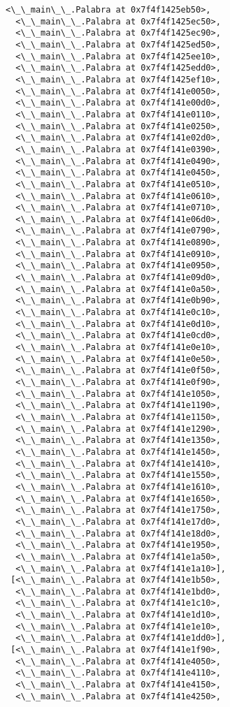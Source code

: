 \documentclass[12pt,a4paper,table]{article}
\begin{document}
\begin{tcolorbox}[breakable, size=fbox, boxrule=.5pt, pad at break*=1mm, opacityfill=0]
\begin{Verbatim}[commandchars=\\\{\}]
  <\_\_main\_\_.Palabra at 0x7f4f1425eb50>,
  <\_\_main\_\_.Palabra at 0x7f4f1425ec50>,
  <\_\_main\_\_.Palabra at 0x7f4f1425ec90>,
  <\_\_main\_\_.Palabra at 0x7f4f1425ed50>,
  <\_\_main\_\_.Palabra at 0x7f4f1425ee10>,
  <\_\_main\_\_.Palabra at 0x7f4f1425edd0>,
  <\_\_main\_\_.Palabra at 0x7f4f1425ef10>,
  <\_\_main\_\_.Palabra at 0x7f4f141e0050>,
  <\_\_main\_\_.Palabra at 0x7f4f141e00d0>,
  <\_\_main\_\_.Palabra at 0x7f4f141e0110>,
  <\_\_main\_\_.Palabra at 0x7f4f141e0250>,
  <\_\_main\_\_.Palabra at 0x7f4f141e02d0>,
  <\_\_main\_\_.Palabra at 0x7f4f141e0390>,
  <\_\_main\_\_.Palabra at 0x7f4f141e0490>,
  <\_\_main\_\_.Palabra at 0x7f4f141e0450>,
  <\_\_main\_\_.Palabra at 0x7f4f141e0510>,
  <\_\_main\_\_.Palabra at 0x7f4f141e0610>,
  <\_\_main\_\_.Palabra at 0x7f4f141e0710>,
  <\_\_main\_\_.Palabra at 0x7f4f141e06d0>,
  <\_\_main\_\_.Palabra at 0x7f4f141e0790>,
  <\_\_main\_\_.Palabra at 0x7f4f141e0890>,
  <\_\_main\_\_.Palabra at 0x7f4f141e0910>,
  <\_\_main\_\_.Palabra at 0x7f4f141e0950>,
  <\_\_main\_\_.Palabra at 0x7f4f141e09d0>,
  <\_\_main\_\_.Palabra at 0x7f4f141e0a50>,
  <\_\_main\_\_.Palabra at 0x7f4f141e0b90>,
  <\_\_main\_\_.Palabra at 0x7f4f141e0c10>,
  <\_\_main\_\_.Palabra at 0x7f4f141e0d10>,
  <\_\_main\_\_.Palabra at 0x7f4f141e0cd0>,
  <\_\_main\_\_.Palabra at 0x7f4f141e0e10>,
  <\_\_main\_\_.Palabra at 0x7f4f141e0e50>,
  <\_\_main\_\_.Palabra at 0x7f4f141e0f50>,
  <\_\_main\_\_.Palabra at 0x7f4f141e0f90>,
  <\_\_main\_\_.Palabra at 0x7f4f141e1050>,
  <\_\_main\_\_.Palabra at 0x7f4f141e1190>,
  <\_\_main\_\_.Palabra at 0x7f4f141e1150>,
  <\_\_main\_\_.Palabra at 0x7f4f141e1290>,
  <\_\_main\_\_.Palabra at 0x7f4f141e1350>,
  <\_\_main\_\_.Palabra at 0x7f4f141e1450>,
  <\_\_main\_\_.Palabra at 0x7f4f141e1410>,
  <\_\_main\_\_.Palabra at 0x7f4f141e1550>,
  <\_\_main\_\_.Palabra at 0x7f4f141e1610>,
  <\_\_main\_\_.Palabra at 0x7f4f141e1650>,
  <\_\_main\_\_.Palabra at 0x7f4f141e1750>,
  <\_\_main\_\_.Palabra at 0x7f4f141e17d0>,
  <\_\_main\_\_.Palabra at 0x7f4f141e18d0>,
  <\_\_main\_\_.Palabra at 0x7f4f141e1950>,
  <\_\_main\_\_.Palabra at 0x7f4f141e1a50>,
  <\_\_main\_\_.Palabra at 0x7f4f141e1a10>],
 [<\_\_main\_\_.Palabra at 0x7f4f141e1b50>,
  <\_\_main\_\_.Palabra at 0x7f4f141e1bd0>,
  <\_\_main\_\_.Palabra at 0x7f4f141e1c10>,
  <\_\_main\_\_.Palabra at 0x7f4f141e1d10>,
  <\_\_main\_\_.Palabra at 0x7f4f141e1e10>,
  <\_\_main\_\_.Palabra at 0x7f4f141e1dd0>],
 [<\_\_main\_\_.Palabra at 0x7f4f141e1f90>,
  <\_\_main\_\_.Palabra at 0x7f4f141e4050>,
  <\_\_main\_\_.Palabra at 0x7f4f141e4110>,
  <\_\_main\_\_.Palabra at 0x7f4f141e4150>,
  <\_\_main\_\_.Palabra at 0x7f4f141e4250>,

\end{Verbatim}
\end{tcolorbox}
\end{document}
